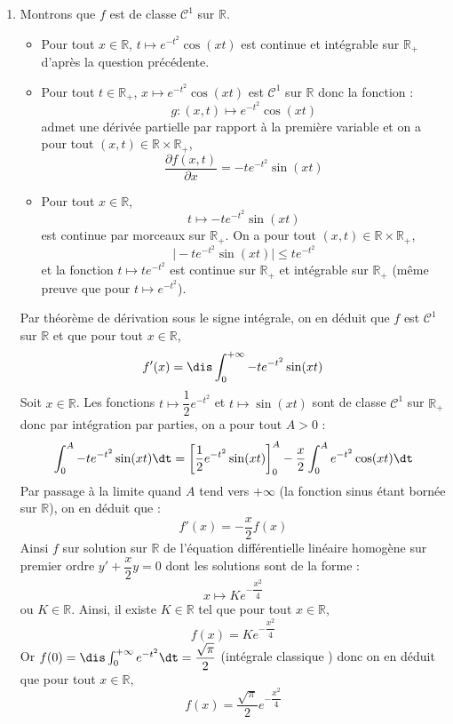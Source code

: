 \documentclass[a4paper,10pt]{report}
\begin{document}
\begin{enumerate}
\item Montrons que $f$ est de classe $\mathcal{C}^1$ sur $\mathbb{R}$.
\begin{itemize}
\item Pour tout $x \in \mathbb{R}$, $t \mapsto e^{-t^2} \cos(xt)$ est continue et intégrable sur $\mathbb{R}_+$ d'après la question précédente.
\item Pour tout $t \in \mathbb{R}_+$, $x \mapsto e^{-t^2} \cos(xt)$ est $\mathcal{C}^1$ sur $\mathbb{R}$ donc la fonction :
$$g: (x,t) \mapsto e^{-t^2} \cos(xt)$$
admet une dérivée partielle par rapport à la première variable et on a pour tout $(x,t) \in \mathbb{R} \times \mathbb{R}_+$,
$$ \dfrac{\partial f (x,t)}{\partial x} = -t e^{-t^2} \sin(xt)$$
\item Pour tout $x \in \mathbb{R}$,
$$ t \mapsto -t e^{-t^2} \sin(xt)$$
est continue par morceaux sur $\mathbb{R}_{+}$. On a pour tout $(x,t) \in \mathbb{R} \times \mathbb{R}_+$,
$$ \vert  -t e^{-t^2} \sin(xt) \vert \leq t e^{-t^2} $$
et la fonction $t \mapsto t e^{-t^2}$ est continue sur $\mathbb{R}_+$ et intégrable sur $\mathbb{R}_+$ (même preuve que pour $t \mapsto e^{-t^2}$).
\end{itemize}
Par théorème de dérivation sous le signe intégrale, on en déduit que $f$ est $\mathcal{C}^1$ sur $\mathbb{R}$ et que pour tout $x \in \mathbb{R}$,
$$f'(x) =  \dis \int_{0}^{+ \infty} -t e^{-t^2} \sin(xt)$$
Soit $x \in \mathbb{R}$. Les fonctions $t \mapsto \dfrac{1}{2} e^{-t^2}$ et $t \mapsto \sin(xt)$ sont de classe $\mathcal{C}^1$ sur $\mathbb{R}_+$ donc par intégration par parties, on a pour tout $A>0$ :
$$ \int_{0}^{A}  -t e^{-t^2} \sin(xt) \dt = \left[\dfrac{1}{2} e^{-t^2}  \sin(xt) \right]_0^A - \dfrac{x}{2} \int_{0}^A e^{-t^2} \cos(xt) \dt$$ 
Par passage à la limite quand $A$ tend vers $+ \infty$ (la fonction sinus étant bornée sur $\mathbb{R}$), on en déduit que :
$$ f'(x) = - \dfrac{x}{2} f(x)$$
Ainsi $f$ sur solution sur $\mathbb{R}$ de l'équation différentielle linéaire homogène sur premier ordre $y'+ \dfrac{x}{2}y=0$ dont les solutions sont de la forme :
$$ x \mapsto K e^{- \dfrac{x^2}{4}}$$
ou $K \in \mathbb{R}$. Ainsi, il existe $K \in \mathbb{R}$ tel que pour tout $x \in \mathbb{R}$,
$$ f(x) = Ke^{- \dfrac{x^2}{4}}$$
Or $f(0)= \dis \int_{0}^{+ \infty} e^{-t^2} \dt = \dfrac{\sqrt{\pi}}{2}$ (intégrale \og classique \fg) donc on en déduit que pour tout $x \in \mathbb{R}$,
$$ f(x) = \dfrac{\sqrt{\pi}}{2 } e^{- \dfrac{x^2}{4}}$$
\end{enumerate}
\end{document}
